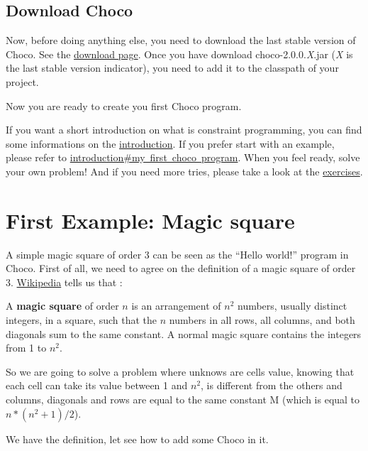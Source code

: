 \section{Download Choco}\label{gettingstarted:downloadchoco}\hypertarget{gettingstarted:downloadchoco}{}
Now, before doing anything else, you need to download the last stable version of Choco. See the \href{http://choco.emn.fr}{download page}. 
Once you have download choco-2.0.0.\emph{X}.jar (\emph{X} is the last stable version indicator), you need to add it to the classpath of your project.

Now you are ready to create you first Choco program.

If you want a short introduction on what is constraint programming, you can find some informations on the \hyperlink{doc:introduction}{introduction}. If you prefer start with an example, please refer to \hyperlink{introduction:myfirstchocoprogram}{introduction\#my\ first\ choco\ program}.
When you feel ready, solve your own problem! And if you need more tries, please take a look at the \hyperlink{exercises}{exercises}. %

\chapter{First Example: Magic square}\label{gettingstarted:firstexample:magicsquare}\hypertarget{gettingstarted:firstexample:magicsquare}{}
A simple magic square of order 3 can be seen as the ``Hello world!'' program in Choco. First of all, we need to agree on the definition of a magic square of order 3.
\href{http://en.wikipedia.org/wiki/Magic_square}{Wikipedia} tells us that :
\begin{myquote}
A \textbf{magic square} of order $n$ is an arrangement of $n^2$ numbers, usually distinct integers, in a square, such that the $n$ numbers in all rows, all columns, and both diagonals sum to the same constant. A normal magic square contains the integers from 1 to $n^2$.
\end{myquote}

So we are going to solve a problem where unknows are cells value, knowing that each cell can take its value between 1 and $n^2$, is different from the others and columns, diagonals and rows are equal to the same constant M (which is equal to $n * (n^2 + 1) / 2$).

We have the definition, let see how to add some Choco in it.

